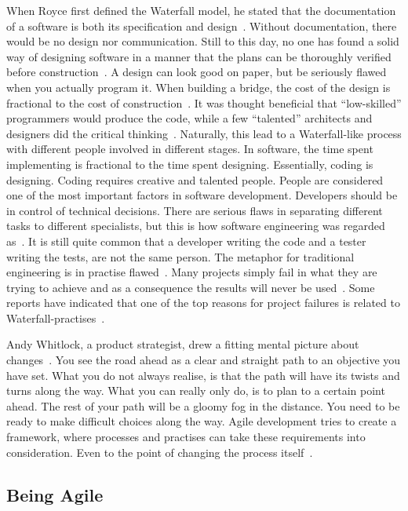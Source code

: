 \documentclass[english]{tktltiki2}
\begin{document}
When Royce first defined the Waterfall model, he stated that the documentation of a software is both its specification and design~\cite{Roy70}. Without documentation, there would be no design nor communication. Still to this day, no one has found a solid way of designing software in a manner that the plans can be thoroughly verified before construction~\cite{Fow05}. A design can look good on paper, but be seriously flawed when you actually program it. When building a bridge, the cost of the design is fractional to the cost of construction~\cite{Fow05}. It was thought beneficial that “low-skilled” programmers would produce the code, while a few “talented” architects and designers did the critical thinking~\cite{Pop02}. Naturally, this lead to a Waterfall-like process with different people involved in different stages. In software, the time spent implementing is fractional to the time spent designing. Essentially, coding is designing. Coding requires creative and talented people. People are considered one of the most important factors in software development. Developers should be in control of technical decisions. There are serious flaws in separating different tasks to different specialists, but this is how software engineering was regarded as~\cite{Roy70}. It is still quite common that a developer writing the code and a tester writing the tests, are not the same person. The metaphor for traditional engineering is in practise flawed~\cite{Fow05}. Many projects simply fail in what they are trying to achieve and as a consequence the results will never be used~\cite{LB03}. Some reports have indicated that one of the top reasons for project failures is related to Waterfall-practises~\cite{LB03}.

Andy Whitlock, a product strategist, drew a fitting mental picture about changes~\cite{Whi14}. You see the road ahead as a clear and straight path to an objective you have set. What you do not always realise, is that the path will have its twists and turns along the way. What you can really only do, is to plan to a certain point ahead. The rest of your path will be a gloomy fog in the distance. You need to be ready to make difficult choices along the way. Agile development tries to create a framework, where processes and practises can take these requirements into consideration. Even to the point of changing the process itself~\cite{Fow05}.

\subsection{Being Agile}
\end{document}
